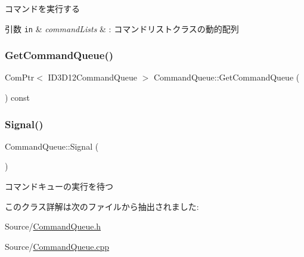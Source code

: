 コマンドを実行する 


\begin{DoxyParams}[1]{引数}
\mbox{\tt in}  & {\em command\+Lists} & \+: コマンドリストクラスの動的配列 \\
\hline
\end{DoxyParams}
\mbox{\label{class_command_queue_a17963d2efd7d03c7310e606246994c23}} 
\subsubsection{\texorpdfstring{Get\+Command\+Queue()}{GetCommandQueue()}}
{\footnotesize\ttfamily Com\+Ptr$<$ I\+D3\+D12\+Command\+Queue $>$ Command\+Queue\+::\+Get\+Command\+Queue (\begin{DoxyParamCaption}{ }\end{DoxyParamCaption}) const}

\mbox{\label{class_command_queue_a9c6cf1b8ebba43239e9a1119e942294a}} 
\subsubsection{\texorpdfstring{Signal()}{Signal()}}
{\footnotesize\ttfamily Command\+Queue\+::\+Signal (\begin{DoxyParamCaption}{ }\end{DoxyParamCaption})}

コマンドキューの実行を待つ 

このクラス詳解は次のファイルから抽出されました\+:\begin{DoxyCompactItemize}
\item 
Source/\mbox{\hyperlink{_command_queue_8h}{Command\+Queue.\+h}}\item 
Source/\mbox{\hyperlink{_command_queue_8cpp}{Command\+Queue.\+cpp}}\end{DoxyCompactItemize}
